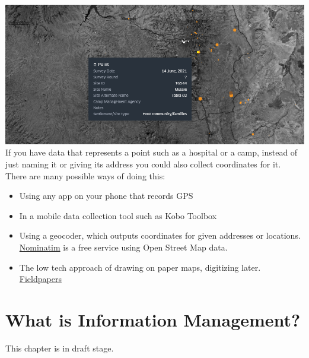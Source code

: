 \documentclass[
  a4paper,
  onecolumn,
  oneside]{book}
\begin{document}
\includegraphics{part1/./images/pointdata.png}\\
If you have data that represents a point such as a hospital or a camp,
instead of just naming it or giving its address you could also collect
coordinates for it. There are many possible ways of doing this:

\begin{itemize}
\item
  Using any app on your phone that records GPS
\item
  In a mobile data collection tool such as Kobo Toolbox
\item
  Using a geocoder, which outputs coordinates for given addresses or
  locations. \href{http://nominatim.openstreetmap.org/}{Nominatim} is a
  free service using Open Street Map data.
\item
  The low tech approach of drawing on paper maps, digitizing later.
  \href{is\%20a\%20good\%20tool\%20for\%20this}{Fieldpapers}
\end{itemize}

\hypertarget{what-is-information-management}{%
\chapter{What is Information
Management?}\label{what-is-information-management}}

\begin{tcolorbox}[enhanced jigsaw, colframe=quarto-callout-warning-color-frame, title=\textcolor{quarto-callout-warning-color}{\faExclamationTriangle}\hspace{0.5em}{Warning}, toptitle=1mm, toprule=.15mm, colbacktitle=quarto-callout-warning-color!10!white, breakable, arc=.35mm, coltitle=black, bottomrule=.15mm, titlerule=0mm, opacityback=0, rightrule=.15mm, bottomtitle=1mm, leftrule=.75mm, left=2mm, opacitybacktitle=0.6, colback=white]

This chapter is in draft stage.

\end{tcolorbox}
\end{document}

